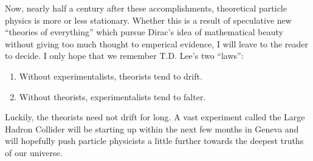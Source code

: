 \documentclass[a4paper,12pt]{book}
\begin{document}
Now, nearly half a century after these accomplishments, theoretical particle physics is more or less stationary. Whether this is a result of speculative new ``theories of everything'' which pursue Dirac's idea of mathematical beauty without giving too much thought to emperical evidence, I will leave to the reader to decide. I only hope that we remember T.D. Lee's two ``laws'':

\begin{enumerate}
 \item Without experimentalists, theorists tend to drift.
 \item Without theorists, experimentalists tend to falter.
\end{enumerate}

Luckily, the theorists need not drift for long. A vast experiment called the Large Hadron Collider will be starting up within the next few months in Geneva and will hopefully push particle physicists a little further towards the deepest truths of our universe.

\end{document}
